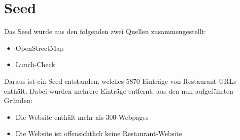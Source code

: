 \section{Seed}
Das Seed wurde aus den folgenden zwei Quellen zusammengestellt:
\begin{itemize}
	\item OpenStreetMap
	\item Lunch-Check
\end{itemize}
Daraus ist ein Seed entstanden, welches 5870 Einträge von Restaurant-URLs enthält.
Dabei wurden mehrere Einträge entfernt, aus den nun aufgeführten Gründen:
\begin{itemize}
	\item Die Website enthält mehr als 300 Webpages
	\item Die Website ist offensichtlich keine Restaurant-Website
\end{itemize}

